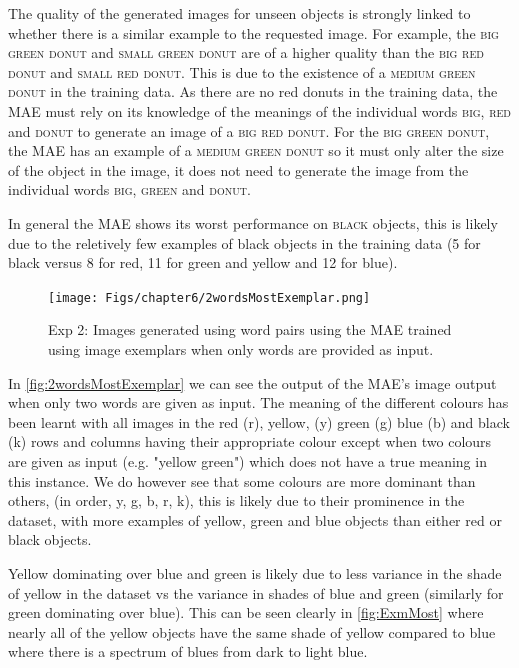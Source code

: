 The quality of the generated images for unseen objects is strongly linked to whether there is a similar example to the requested image. For example, the \textsc{big green donut} and \textsc{small green donut} are of a higher quality than the \textsc{big red donut} and \textsc{small red donut}. This is due to the existence of a \textsc{medium green donut} in the training data. As there are no red donuts in the training data, the \ac{MAE} must rely on its knowledge of the meanings of the individual words \textsc{big}, \textsc{red} and \textsc{donut} to generate an image of a \textsc{big red donut}. For the \textsc{big green donut}, the \ac{MAE} has an example of a \textsc{medium green donut} so it must only alter the size of the object in the image, it does not need to generate the image from the individual words \textsc{big}, \textsc{green} and \textsc{donut}.

In general the \ac{MAE} shows its worst performance on \textsc{black} objects, this is likely due to the reletively few examples of black objects in the training data (5 for black versus 8 for red, 11 for green and yellow and 12 for blue).

\begin{figure}[ht]
    \centering
    \texttt{[image: Figs/chapter6/2wordsMostExemplar.png]}
    \caption{Exp 2: Images generated using word pairs using the \ac{MAE} trained using image exemplars when only words are provided as input.}
    \label{fig:2wordsMostExemplar}
\end{figure}


In \autoref{fig:2wordsMostExemplar} we can see the output of the \ac{MAE}'s image output when only two words are given as input. The meaning of the different colours has been learnt with all images in the red (r), yellow, (y) green (g) blue (b) and black (k) rows and columns having their appropriate colour except when two colours are given as input (e.g. "yellow green") which does not have a true meaning in this instance. We do however see that some colours are more dominant than others, (in order, y, g, b, r, k), this is likely due to their prominence in the dataset, with more examples of yellow, green and blue objects than either red or black objects. 

Yellow dominating over blue and green is likely due to less variance in the shade of yellow in the dataset vs the variance in shades of blue and green (similarly for green dominating over blue). This can be seen clearly in \autoref{fig:ExmMost} where nearly all of the yellow objects have the same shade of yellow compared to blue where there is a spectrum of blues from dark to light blue.

